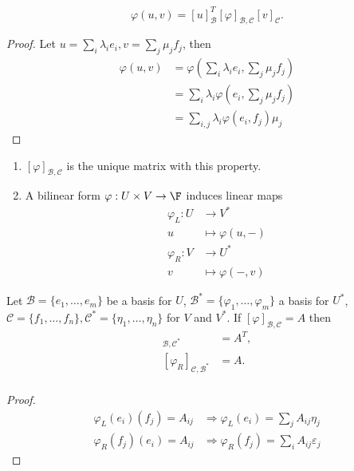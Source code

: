 \documentclass[a4paper]{article}
\newcommand*{\basis}{\mathcal}
\theoremstyle{definition}
\begin{document}
\begin{lemma}
  \[
    \varphi(u, v) = [u]_{\basis B}^T [\varphi]_{\basis B, \basis C} [v]_{\basis C}.
  \]
\end{lemma}

\begin{proof}
  Let \(u = \sum_{i}^{ }\lambda_ie_i, v = \sum_{j}^{} \mu_jf_j\), then
  \begin{align*}
    \varphi(u, v) &= \varphi\left( \sum_{i}^{ }\lambda_ie_i, \sum_{j}^{} \mu_jf_j \right) \\
                  &= \sum_{i}^{ }\lambda_i \varphi\left(e_i, \sum_{j}^{} \mu_jf_j \right)\\
                  &= \sum_{i, j}^{ }\lambda_i \varphi(e_i, f_j) \mu_j
  \end{align*}
\end{proof}

\begin{note}\leavevmode
  \begin{enumerate}
  \item \([\varphi]_{\basis B, \basis C}\) is the unique matrix with this property.
  \item A bilinear form \(\varphi: U \times V \to \F\) induces linear maps
    \begin{align*}
      \varphi_L: U &\to V^* \\
      u &\mapsto \varphi(u, -) \\
      \varphi_R: V &\to U^* \\
      v &\mapsto \varphi(-, v)
    \end{align*}
  \end{enumerate}
\end{note}

\begin{lemma}
  Let \(\basis B = \{e_1,\dots, e_m\}\) be a basis for \(U\), \(\basis B^* = \{\varphi_1,\dots, \varphi_m\}\) a basis for \(U^*\), \(\basis C = \{f_1,\dots, f_n\}, \basis C^* = \{\eta_1,\dots, \eta_n\}\) for \(V\) and \(V^*\). If \([\varphi]_{\basis B, \basis C} = A\) then
  \begin{align*}
    [\varphi_L]_{\basis B, \basis C^*} &= A^T, \\
    [\varphi_R]_{\basis C, \basis B^*} &= A. \\
  \end{align*}
\end{lemma}

\begin{proof}
  \begin{align*}
    \varphi_L(e_i)(f_j) = A_{ij} &\Longrightarrow \varphi_L(e_i) = \sum_{j}^{ }A_{ij}\eta_j \\
    \varphi_R(f_j)(e_i) = A_{ij} &\Longrightarrow \varphi_R(f_j) = \sum_{i}^{ }A_{ij}\varepsilon_j
  \end{align*}
\end{proof}
\end{document}
